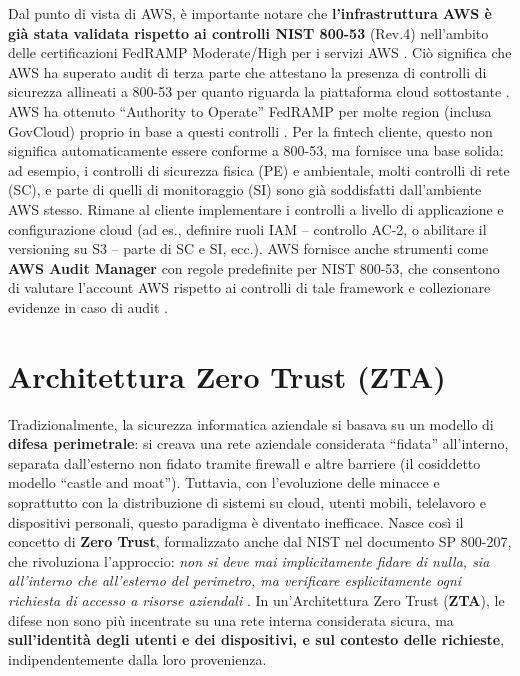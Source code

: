 \documentclass[a4paper,12pt]{report}
\begin{document}
Dal punto di vista di AWS, è importante notare che \textbf{l’infrastruttura AWS è già stata validata rispetto ai controlli NIST 800-53} (Rev.4) nell’ambito delle certificazioni FedRAMP Moderate/High per i servizi AWS \cite{awsNist}. Ciò significa che AWS ha superato audit di terza parte che attestano la presenza di controlli di sicurezza allineati a 800-53 per quanto riguarda la piattaforma cloud sottostante \cite{awsNist}. AWS ha ottenuto “Authority to Operate” FedRAMP per molte region (inclusa GovCloud) proprio in base a questi controlli \cite{awsNist}. Per la fintech cliente, questo non significa automaticamente essere conforme a 800-53, ma fornisce una base solida: ad esempio, i controlli di sicurezza fisica (PE) e ambientale, molti controlli di rete (SC), e parte di quelli di monitoraggio (SI) sono già soddisfatti dall’ambiente AWS stesso. Rimane al cliente implementare i controlli a livello di applicazione e configurazione cloud (ad es., definire ruoli IAM – controllo AC-2, o abilitare il versioning su S3 – parte di SC e SI, ecc.). AWS fornisce anche strumenti come \textbf{AWS Audit Manager} con regole predefinite per NIST 800-53, che consentono di valutare l’account AWS rispetto ai controlli di tale framework e collezionare evidenze in caso di audit \cite{awsAuditManager}.

\section{Architettura Zero Trust (ZTA)}
\label{sec:zero_trust}
Tradizionalmente, la sicurezza informatica aziendale si basava su un modello di \textbf{difesa perimetrale}: si creava una rete aziendale considerata “fidata” all’interno, separata dall’esterno non fidato tramite firewall e altre barriere (il cosiddetto modello “castle and moat”). Tuttavia, con l’evoluzione delle minacce e soprattutto con la distribuzione di sistemi su cloud, utenti mobili, telelavoro e dispositivi personali, questo paradigma è diventato inefficace. Nasce così il concetto di \textbf{Zero Trust}, formalizzato anche dal NIST nel documento SP 800-207, che rivoluziona l’approccio: \textit{non si deve mai implicitamente fidare di nulla, sia all’interno che all’esterno del perimetro, ma verificare esplicitamente ogni richiesta di accesso a risorse aziendali} \cite{nistZeroTrust}. In un’Architettura Zero Trust (\textbf{ZTA}), le difese non sono più incentrate su una rete interna considerata sicura, ma \textbf{sull’identità degli utenti e dei dispositivi, e sul contesto delle richieste}, indipendentemente dalla loro provenienza.
\end{document}
